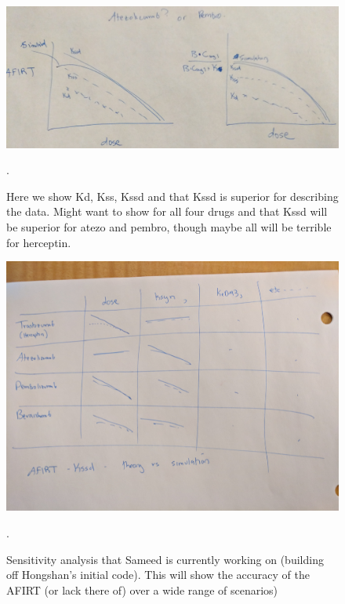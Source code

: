 \begin{figure}[H]
\centering
\includegraphics[width=\textwidth]{figures/Kssd_Kss_Kd.jpg}
\caption{Here we show Kd, Kss, Kssd and that Kssd is superior for describing the data.  Might want to show for all four drugs and that Kssd will be superior for atezo and pembro, though maybe all will be terrible for herceptin.
\label{fig:Kssd}}.
\end{figure}

\begin{figure}[H]
\centering
\includegraphics[width=\textwidth]{figures/SensitivityAnalysis.jpg}
\caption{Sensitivity analysis that Sameed is currently working on (building off Hongshan's initial code).  This will show the accuracy of the AFIRT (or lack there of) over a wide range of scenarios)
\label{fig:sensitivity}}.
\end{figure}

